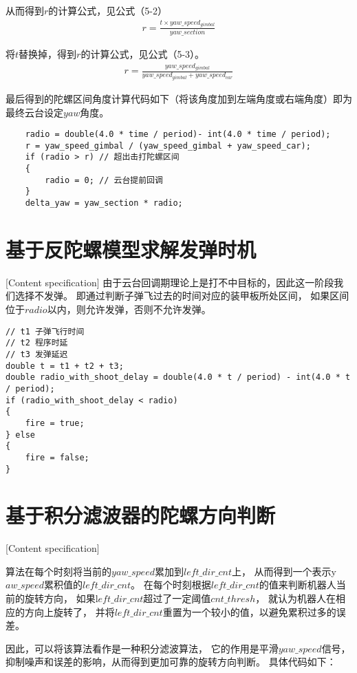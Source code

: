 从而得到$r$的计算公式，见公式（5-2）
\begin{gather}
r = \frac{t \times yaw\_speed_{gimbal} }{yaw\_section}
\end{gather}

将$t$替换掉，得到$r$的计算公式，见公式（5-3）。
\begin{gather}
    r = \frac{yaw\_speed_{gimbal}}{yaw\_speed_{gimbal} + yaw\_speed_{car}}
\end{gather}

最后得到的陀螺区间角度计算代码如下（将该角度加到左端角度或右端角度）即为最终云台设定$yaw$角度。
\begin{lstlisting}
    radio = double(4.0 * time / period)- int(4.0 * time / period);
    r = yaw_speed_gimbal / (yaw_speed_gimbal + yaw_speed_car);
    if (radio > r) // 超出击打陀螺区间
    {
        radio = 0; // 云台提前回调
    }
    delta_yaw = yaw_section * radio;
\end{lstlisting}

\section{基于反陀螺模型求解发弹时机}[Content specification]
由于云台回调期理论上是打不中目标的，因此这一阶段我们选择不发弹。
即通过判断子弹飞过去的时间对应的装甲板所处区间，
如果区间位于$radio$以内，则允许发弹，否则不允许发弹。
\begin{lstlisting}
// t1 子弹飞行时间
// t2 程序时延
// t3 发弹延迟
double t = t1 + t2 + t3;
double radio_with_shoot_delay = double(4.0 * t / period) - int(4.0 * t / period);
if (radio_with_shoot_delay < radio)
{
    fire = true;
} else
{
    fire = false;
}
\end{lstlisting}



\section{基于积分滤波器的陀螺方向判断}[Content specification]

算法在每个时刻将当前的$yaw\_speed$累加到$left\_dir\_cnt$上，
从而得到一个表示y$aw\_speed$累积值的$left\_dir\_cnt$。
在每个时刻根据$left\_dir\_cnt$的值来判断机器人当前的旋转方向，
如果l$eft\_dir\_cnt$超过了一定阈值$cnt\_thresh$，
就认为机器人在相应的方向上旋转了，
并将$left\_dir\_cnt$重置为一个较小的值，以避免累积过多的误差。

因此，可以将该算法看作是一种积分滤波算法，
它的作用是平滑$yaw\_speed$信号，抑制噪声和误差的影响，从而得到更加可靠的旋转方向判断。
具体代码如下：

